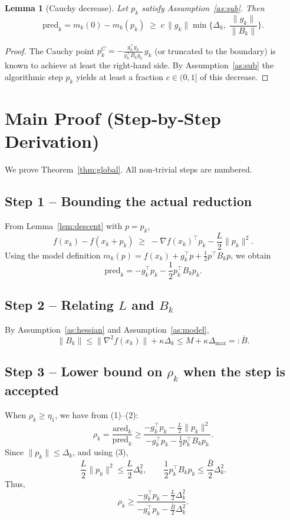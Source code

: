 \documentclass{article}
\newtheorem{lemma}{Lemma}
\begin{document}
\begin{lemma}[Cauchy decrease]\label{lem:cauchy}
Let $p_k$ satisfy Assumption~\ref{as:sub}. Then
\[
\text{pred}_k = m_k(0)-m_k(p_k)\;\ge\;c\,\|g_k\|\min\!\bigl\{\Delta_k,\;\frac{\|g_k\|}{\|B_k\|}\bigr\}.
\]
\end{lemma}
\begin{proof}
The Cauchy point $p_k^{C}= -\frac{g_k^{\top}g_k}{g_k^{\top}B_k g_k}\,g_k$ (or truncated to the boundary) is known to achieve at least the right‑hand side. By Assumption~\ref{as:sub} the algorithmic step $p_k$ yields at least a fraction $c\in(0,1]$ of this decrease. \qedhere
\end{proof}

\section*{Main Proof (Step‑by‑Step Derivation)}
We prove Theorem~\ref{thm:global}. All non‑trivial steps are numbered.

\subsection*{Step 1 – Bounding the actual reduction}
From Lemma~\ref{lem:descent} with $p=p_k$,
\[
f(x_k)-f(x_k+p_k)\;\ge\; -\nabla f(x_k)^{\top}p_k-\frac{L}{2}\|p_k\|^{2}. \tag{1}
\]
Using the model definition $m_k(p)=f(x_k)+g_k^{\top}p+\frac12p^{\top}B_kp$, we obtain
\[
\text{pred}_k = -g_k^{\top}p_k-\frac12p_k^{\top}B_kp_k. \tag{2}
\]

\subsection*{Step 2 – Relating $L$ and $B_k$}
By Assumption~\ref{as:hessian} and Assumption~\ref{as:model},
\[
\|B_k\|\le \|\nabla^{2}f(x_k)\|+\kappa\Delta_k\le M+\kappa\Delta_{\max}=: \bar{B}. \tag{3}
\]

\subsection*{Step 3 – Lower bound on $\rho_k$ when the step is accepted}
When $\rho_k\ge\eta_1$, we have from (1)–(2):
\[
\rho_k = \frac{\text{ared}_k}{\text{pred}_k}
      \ge \frac{-g_k^{\top}p_k-\frac{L}{2}\|p_k\|^{2}}{-g_k^{\top}p_k-\frac12p_k^{\top}B_kp_k}. \tag{4}
\]
Since $\|p_k\|\le\Delta_k$, and using (3),
\[
\frac{L}{2}\|p_k\|^{2}\le \frac{L}{2}\Delta_k^{2},\qquad
\frac12p_k^{\top}B_kp_k\le \frac{\bar{B}}{2}\Delta_k^{2}. \tag{5}
\]
Thus,
\[
\rho_k\ge \frac{-g_k^{\top}p_k-\frac{L}{2}\Delta_k^{2}}{-g_k^{\top}p_k-\frac{\bar{B}}{2}\Delta_k^{2}}. \tag{6}
\]
\end{document}
